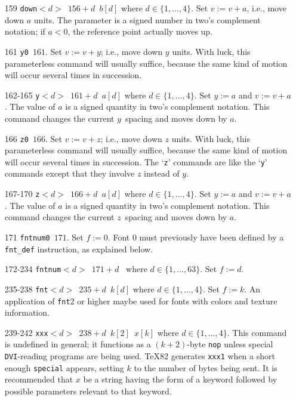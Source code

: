 \documentclass{article}
\begin{document}
\begin{itemize}
\item[159] \texttt{down$<d>$ $156+d$ $b[d]$} where $d\in\{1,\dots,4\}$. 
Set $v:=v+a$, i.e., move down $a$ units. 
The parameter is a signed number in two's complement notation; 
if $a<0$, the reference point actually moves up.


\item[161] \texttt{y0 $161$}. 
Set $v:=v+y$; i.e., move down $y$ units. 
With luck, this parameterless command will usually suffice, 
because the same kind of motion will occur several times in succession.

\item[162-165] \texttt{y$<d>$ $161+d$ $a[d]$} where $d\in\{1,\dots,4\}$. 
Set $y:=a$ and $v:=v+a$. 
The value of $a$ is a signed quantity in two's complement notation. 
This command changes the current $y$~spacing and moves down by $a$. 

\item[166] \texttt{z0 $166$}. 
Set $v:=v+z$; i.e., move down $z$ units. 
With luck, this parameterless command will usually suffice, 
because the same kind of motion will occur several times in succession.
The `\texttt{z}' commands are like the `\texttt{y}' commands 
except that they involve $z$ instead of $y$. 

\item[167-170] \texttt{z$<d>$ $166+d$ $a[d]$} where $d\in\{1,\dots,4\}$. 
Set $y:=a$ and $v:=v+a$. 
The value of $a$ is a signed quantity in two's complement notation. 
This command changes the current $z$~spacing and moves down by $a$. 


\item[171] \texttt{fntnum0 $171$}. 
Set $f:=0$. Font 0 must previously have been
defined by a \texttt{fnt\_def} instruction, as explained below.

\item[172-234] \texttt{fntnum$<d>$ $171+d$ } where $d\in\{1,\dots,63\}$. 
Set $f:=d$. 


\item[235-238] \texttt{fnt$<d>$ $235+d$ $k[d]$} where $d\in\{1,\dots,4\}$. 
Set $f:=k$. 
An application of \texttt{fnt$2$} or higher 
maybe used for fonts with colors and texture information. 

\item[239-242] \texttt{xxx$<d>$ $238+d$ $k[2]$ $x[k]$} 
where $d\in\{1,\dots,4\}$. 
This command is undefined in general; 
it functions as a $(k+2)$-byte \texttt{nop} 
unless special \texttt{DVI}-reading programs are being used. 
\TeX82 generates \texttt{xxx1} when a short enough \texttt{special} appears, 
setting $k$ to the number of bytes being sent. 
It is recommended that $x$ be a string having the form of a keyword 
followed by possible parameters relevant to that keyword.


\end{itemize}
\end{document}
